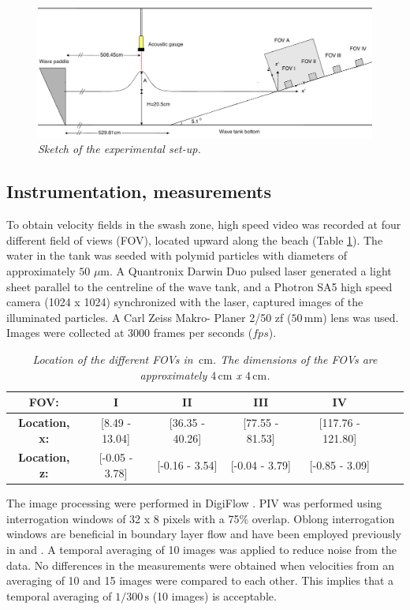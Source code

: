 \documentclass[review, authoryear]{elsarticle}
\newcommand{\s}{\,\mbox{s}}
\newcommand{\cm}{\,\mbox{cm}}
\newcommand{\mm}{\,\mbox{mm}}
\begin{document}
\begin{figure}[]
\centering
\includegraphics[width=\textwidth]{./Figures/setup3.png}
\caption{\textit{ Sketch of  the experimental set-up.}}
\label{fig:beach_tegning}
\end{figure}

\subsection{Instrumentation, measurements}
\label{ins_measure}
To obtain velocity fields in the swash zone, high speed video was recorded at four different field of views (FOV), located upward along the beach (Table \ref{tab:loc}).  The water in the tank was seeded with polymid particles with diameters of approximately $50$ $\mu$m. A Quantronix Darwin Duo pulsed laser generated a light sheet parallel to the centreline of the wave tank, and a Photron SA5 high speed camera (1024 x 1024) synchronized with the laser, captured images of the illuminated particles. A Carl Zeiss Makro- Planer 2/50 zf ($50\mm$) lens was used. Images were collected at 3000 frames per seconds ($fps$).
 \begin{table}[]
 \centering
\caption{\textit{Location of the different FOVs  in $\cm$. The dimensions of the FOVs are approximately $4\cm$ x $4\cm$.}}
\begin{tabular}{|c|c|c|c|c|c|c|}
\hline
\textbf{FOV:}      & I                   & II                 & III     & IV \\ \hline
\textbf{Location, x:}& {[}8.49 - 13.04{]} & {[}36.35 - 40.26{]} & {[}77.55 - 81.53{]} & {[}117.76 - 121.80{]} 
 \\ \hline
\textbf{Location, z:}&  {[}-0.05 - 3.78{]} & {[}-0.16 - 3.54{]} & {[}-0.04 - 3.79{]} & {[}-0.85 - 3.09{]} 
\\ \hline
\end{tabular}
\label{tab:loc}
\end{table}
The image processing were performed in DigiFlow \citep{digiflow}. PIV was performed using interrogation windows of 32 x 8 pixels with a 75\% overlap. Oblong interrogation windows are beneficial in boundary layer flow and have been employed previously in \cite{liu2007boundary} and \cite{pedersen2013runup}. A temporal averaging of 10 images was applied to reduce noise from the data. No differences in the measurements were obtained when velocities from an averaging of 10 and 15 images were compared to each other. This implies that a temporal averaging of $1/300 \s$ (10 images) is acceptable.
\end{document}
